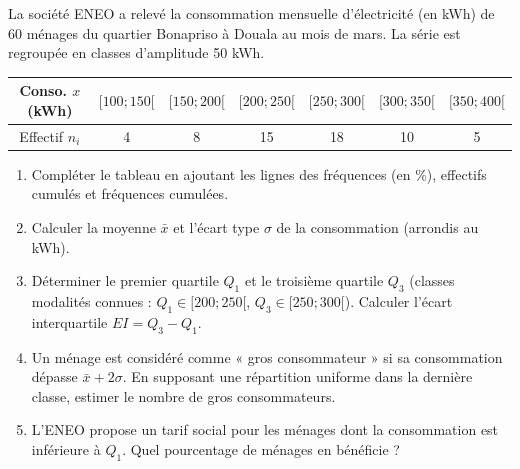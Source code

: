 \documentclass[11pt]{article}
\begin{document}
\begin{exercice}
\label{exo:elec}
La société ENEO a relevé la consommation mensuelle d'électricité (en kWh) de 60 ménages du quartier Bonapriso à Douala au mois de mars. La série est regroupée en classes d'amplitude 50 kWh.

\begin{center}
\begin{tabular}{|c|c|c|c|c|c|c|}
\hline
Conso. $x$ (kWh) & $[100; 150[$ & $[150; 200[$ & $[200; 250[$ & $[250; 300[$ & $[300; 350[$ & $[350; 400[$ \\ \hline
Effectif $n_i$ & 4 & 8 & 15 & 18 & 10 & 5 \\ \hline
\end{tabular}
\end{center}

\begin{enumerate}
    \item Compléter le tableau en ajoutant les lignes des fréquences (en \%), effectifs cumulés et fréquences cumulées.
    \item Calculer la moyenne $\bar{x}$ et l'écart type $\sigma$ de la consommation (arrondis au kWh).
    \item Déterminer le premier quartile $Q_1$ et le troisième quartile $Q_3$ (classes modalités connues : $Q_1 \in [200; 250[$, $Q_3 \in [250; 300[$). Calculer l'écart interquartile $EI = Q_3 - Q_1$.
    \item Un ménage est considéré comme « gros consommateur » si sa consommation dépasse $\bar{x} + 2\sigma$. En supposant une répartition uniforme dans la dernière classe, estimer le nombre de gros consommateurs.
    \item L'ENEO propose un tarif social pour les ménages dont la consommation est inférieure à $Q_1$. Quel pourcentage de ménages en bénéficie ?
\end{enumerate}
\end{exercice}
\end{document}
